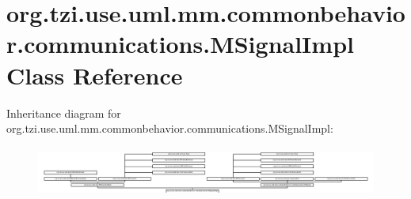 \hypertarget{classorg_1_1tzi_1_1use_1_1uml_1_1mm_1_1commonbehavior_1_1communications_1_1_m_signal_impl}{\section{org.\-tzi.\-use.\-uml.\-mm.\-commonbehavior.\-communications.\-M\-Signal\-Impl Class Reference}
\label{classorg_1_1tzi_1_1use_1_1uml_1_1mm_1_1commonbehavior_1_1communications_1_1_m_signal_impl}
}
Inheritance diagram for org.\-tzi.\-use.\-uml.\-mm.\-commonbehavior.\-communications.\-M\-Signal\-Impl\-:\begin{figure}[H]
\begin{center}
\leavevmode
\includegraphics[height=1.679520cm]{classorg_1_1tzi_1_1use_1_1uml_1_1mm_1_1commonbehavior_1_1communications_1_1_m_signal_impl}
\end{center}
\end{figure}
